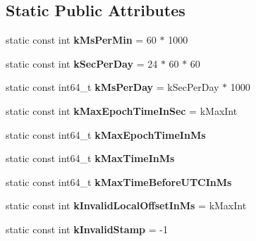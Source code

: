 \subsection*{Static Public Attributes}
\begin{DoxyCompactItemize}
\item 
\hypertarget{classv8_1_1internal_1_1_date_cache_a3c761028d118de4a4d1e48b61cf4d349}{}static const int {\bfseries k\+Ms\+Per\+Min} = 60 $\ast$ 1000\label{classv8_1_1internal_1_1_date_cache_a3c761028d118de4a4d1e48b61cf4d349}

\item 
\hypertarget{classv8_1_1internal_1_1_date_cache_a79dad318641797f0763f3ec7c29f206f}{}static const int {\bfseries k\+Sec\+Per\+Day} = 24 $\ast$ 60 $\ast$ 60\label{classv8_1_1internal_1_1_date_cache_a79dad318641797f0763f3ec7c29f206f}

\item 
\hypertarget{classv8_1_1internal_1_1_date_cache_aba1f60dee0b7f7d1b7e0b99323e6d613}{}static const int64\+\_\+t {\bfseries k\+Ms\+Per\+Day} = k\+Sec\+Per\+Day $\ast$ 1000\label{classv8_1_1internal_1_1_date_cache_aba1f60dee0b7f7d1b7e0b99323e6d613}

\item 
\hypertarget{classv8_1_1internal_1_1_date_cache_a9b0e9e5f19fd9e849462123954e0557d}{}static const int {\bfseries k\+Max\+Epoch\+Time\+In\+Sec} = k\+Max\+Int\label{classv8_1_1internal_1_1_date_cache_a9b0e9e5f19fd9e849462123954e0557d}

\item 
static const int64\+\_\+t {\bfseries k\+Max\+Epoch\+Time\+In\+Ms}
\item 
static const int64\+\_\+t {\bfseries k\+Max\+Time\+In\+Ms}
\item 
static const int64\+\_\+t {\bfseries k\+Max\+Time\+Before\+U\+T\+C\+In\+Ms}
\item 
\hypertarget{classv8_1_1internal_1_1_date_cache_ab1f3dcb4895b2e277589cce9d025c104}{}static const int {\bfseries k\+Invalid\+Local\+Offset\+In\+Ms} = k\+Max\+Int\label{classv8_1_1internal_1_1_date_cache_ab1f3dcb4895b2e277589cce9d025c104}

\item 
\hypertarget{classv8_1_1internal_1_1_date_cache_a672aa540aa45bd02ac9eea74a1536841}{}static const int {\bfseries k\+Invalid\+Stamp} = -\/1\label{classv8_1_1internal_1_1_date_cache_a672aa540aa45bd02ac9eea74a1536841}

\end{DoxyCompactItemize}


